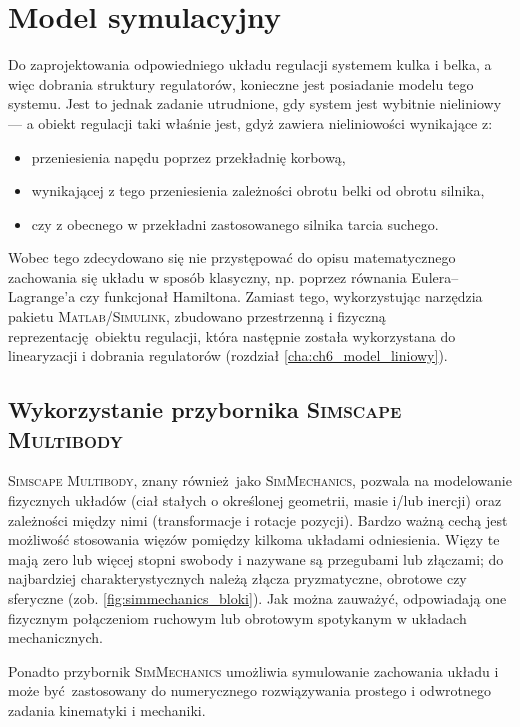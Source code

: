 \chapter{Model symulacyjny}
\label{cha:ch4_model_symulacyjny}

Do zaprojektowania odpowiedniego układu regulacji systemem kulka i belka, a więc dobrania struktury regulatorów, konieczne jest posiadanie modelu tego systemu. Jest to jednak zadanie utrudnione, gdy system jest wybitnie nieliniowy --- a obiekt regulacji taki właśnie jest, gdyż zawiera nieliniowości wynikające z:
\begin{itemize}
    \item przeniesienia napędu poprzez przekładnię korbową,
    \item wynikającej z tego przeniesienia zależności obrotu belki od obrotu silnika,
    \item czy z obecnego w przekładni zastosowanego silnika tarcia suchego.
\end{itemize}

Wobec tego zdecydowano się nie przystępować do opisu matematycznego zachowania się układu w sposób klasyczny, np. poprzez równania Eulera--Lagrange'a czy funkcjonał Hamiltona. Zamiast tego, wykorzystując narzędzia pakietu \textsc{Matlab/Simulink}, zbudowano przestrzenną i fizyczną reprezentację obiektu regulacji, która następnie została wykorzystana do linearyzacji i dobrania regulatorów (rozdział \ref{cha:ch6_model_liniowy}).

\section{Wykorzystanie przybornika \textsc{Simscape Multibody}}
\label{sec:ch4_simmechanics}

\textsc{Simscape Multibody}, znany również jako \textsc{SimMechanics}, pozwala na modelowanie fizycznych układów (ciał stałych o określonej geometrii, masie i/lub inercji) oraz zależności między nimi (transformacje i rotacje pozycji). Bardzo ważną cechą jest możliwość stosowania więzów pomiędzy kilkoma układami odniesienia. Więzy te mają zero lub więcej stopni swobody i nazywane są przegubami lub złączami; do najbardziej charakterystycznych należą złącza pryzmatyczne, obrotowe czy sferyczne (zob. \cref{fig:simmechanics_bloki}). Jak można zauważyć, odpowiadają one fizycznym połączeniom ruchowym lub obrotowym spotykanym w układach mechanicznych.

Ponadto przybornik \textsc{SimMechanics} umożliwia symulowanie zachowania układu i może być zastosowany do numerycznego rozwiązywania prostego i odwrotnego zadania kinematyki i mechaniki.

